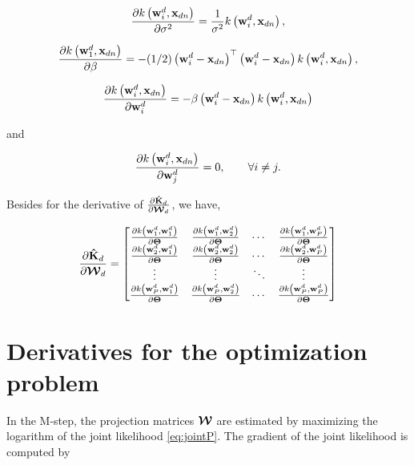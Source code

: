 	\begin{align}
	\frac{\partial \kernelwx{i}}{\partial \sigma^2} = \frac{1}{\sigma^2}\kernelwx{i},
	\end{align}
	
	\begin{align}
	\frac{\partial \kernelwx{1}}{\partial \beta} = -(1/2)\left(\mathbf{w}_i^d-\mathbf{x}_{dn}\right)^\top\left(\mathbf{w}_i^d-\mathbf{x}_{dn}\right)\kernelwx{i},
	\end{align}
	
	\begin{align}
	\frac{\partial \kernelwx{i}}{\partial \wIj{i}} = -\beta\left(\mathbf{w}_i^d-\mathbf{x}_{dn}\right)\kernelwx{i}
	\end{align}
	
	and
	
	\begin{align}
	\frac{\partial \kernelwx{i}}{\partial \mathbf{w}_j^d} =0,   \quad \quad \forall i\ne j.
	\end{align}
	
	
	Besides for the derivative of $\frac{\partial \mathbf{\hat{K}}_d}{\dWj}$, we have,
	
	\begin{align}
	\frac{\partial \mathbf{\hat{K}}_d}{\dWj} =  \left[ \begin{matrix}
	\frac{\partial \kernelww{1}{1}}{\dWd} & \frac{\partial \kernelww{1}{2}}{\dWd} & \cdots & \frac{\partial \kernelww{1}{P}}{\dWd}\\
	\frac{\partial \kernelww{2}{1}}{\dWd} & \frac{\partial \kernelww{2}{2}}{\dWd} & \cdots & \frac{\partial \kernelww{2}{P}}{\dWd}\\
	\vdots  & \vdots  & \ddots & \vdots  \\
	\frac{\partial \kernelww{P}{1}}{\dWd} & \frac{\partial \kernelww{P}{2}}{\dWd} & \cdots & \frac{\partial \kernelww{P}{P}}{\dWd}\\
	\end{matrix}\right] 
	\end{align}
	
	
	\section{Derivatives for the optimization problem}
	
	In the M-step, the projection matrices $\W$ are estimated by maximizing the logarithm of the joint likelihood \eqref{eq:jointP}. The gradient of the joint likelihood is computed by
	
